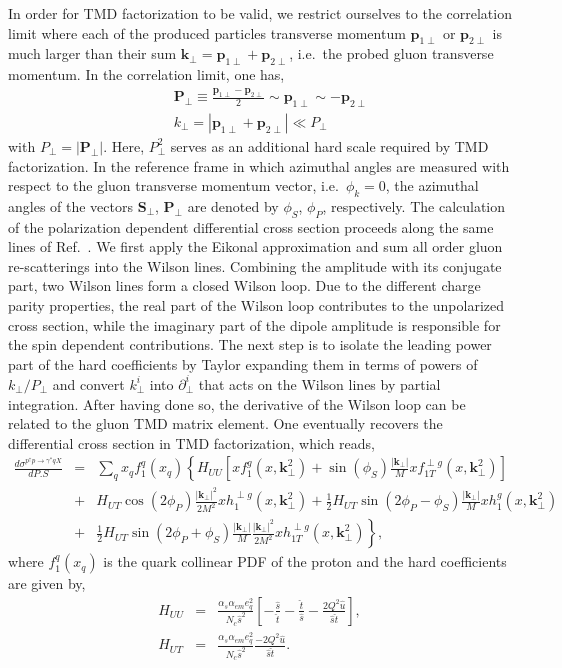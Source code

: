 \documentclass[prd,aps,preprintnumbers,fleqn,showpacs,nofootinbib,superscriptaddress]{revtex4}
\newcommand{\nn}{\nonumber}
\def\nn{\nonumber}
\begin{document}
In order for TMD factorization to be valid, we restrict ourselves to the correlation limit where each of
the produced particles transverse momentum $\bm{p}_{1\perp}$ or $\bm{p}_{2\perp}$ is much larger
than their sum $\bm{k}_\perp=\bm{p}_{1\perp}+\bm{p}_{2\perp}$, i.e.\ the probed gluon transverse momentum.
In the correlation limit, one has,
 \begin{eqnarray}
&&\bm{P}_\perp \equiv \frac{\bm{p}_{1\perp}-\bm{p}_{2\perp}}{2} \sim  \bm{p}_{1\perp} \sim -\bm{p}_{2\perp}
\\
&&k_\perp=|\bm{p}_{1\perp}+\bm{p}_{2\perp}| \ll P_\perp
 \end{eqnarray}
 with $P_\perp = |\bm{P}_\perp|$. Here, $P_\perp^2$ serves as an additional hard scale required by TMD factorization. In the reference frame in
 which azimuthal angles are measured with respect to the gluon transverse momentum vector, i.e.\ $\phi_k=0$,
 the azimuthal angles of  the vectors $\bm{S}_\perp$, $\bm{P}_\perp$ are denoted by  $\phi_S$, $\phi_P$, respectively.
 The calculation of the polarization dependent differential cross section
 proceeds along the same lines of Ref.~\cite{Boer:2017xpy}. We first apply the Eikonal approximation and sum all order gluon
re-scatterings into the Wilson lines. Combining the amplitude with its conjugate part, two Wilson lines form
a closed Wilson loop. Due to the different charge parity properties, the real part of the Wilson loop contributes
to the unpolarized cross section, while the imaginary part of the dipole amplitude is responsible for the spin
dependent contributions. The next step is to isolate the leading power
part of the hard coefficients by  Taylor expanding them in terms of powers of $k_\perp/P_\perp$ and
convert $k_\perp^i$ into $\partial_\perp^i$ that acts on the Wilson lines by partial integration.
After having done so, the derivative of the Wilson loop can be related to the gluon TMD matrix element.
One eventually recovers the differential cross section in TMD factorization, which reads,
\begin{eqnarray} 
\frac{d\sigma^{p^\uparrow p\to \gamma^*qX}}{dP.S}&=&\sum_q  x_q  f_1^q(x_q)
 \left \{ H_{UU} \left [x f^g_{1}(x,\bm{k}_{\perp}^2)+ \sin (\phi_S)
\frac{|\bm{k}_\perp|}{M} x f_{1T}^{\perp g}(x,\bm{k}_{\perp}^2)\right ]  \right.
 \nn \\ 
 &+& \left.  H_{UT}    \cos(2\phi_P)  \frac{|\bm{k}_\perp|^2}{2M^2} x h_1^{\perp g} (x,\bm{k}_{\perp}^2) 
  +    \frac{1}{2} H_{UT}  \sin(2\phi_P-\phi_S)  \frac{|\bm{k}_\perp|}{M} x h_{1}^g (x,\bm{k}_{\perp}^2)\right.\nn \\  
  &+&  \left.  \frac{1}{2} H_{UT} \sin(2\phi_P +\phi_S)
   \frac{|\bm{k}_\perp|}{M} \frac{|\bm{k}_\perp|^2}{2 M^2} x h_{1T}^{\perp g}(x,\bm{k}_{\perp}^2)  \right \} ,
\end{eqnarray}
where $f_1^q(x_q)$ is the quark collinear PDF of the proton and the hard coefficients are given by,
\begin{eqnarray}
H_{UU}&=&\frac{\alpha_s \alpha_{em} e_q^2}{N_c \hat s^2}
\left [ -\frac{\hat s}{\hat t}-\frac{\hat t}{\hat s}- \frac{2Q^2\hat u}{\hat s \hat t} \right ],
\\
H_{UT}&=&\frac{\alpha_s \alpha_{em} e_q^2}{N_c \hat s^2}\frac{-2Q^2 \hat u }{\hat s \hat t} .
\end{eqnarray}
\end{document}
